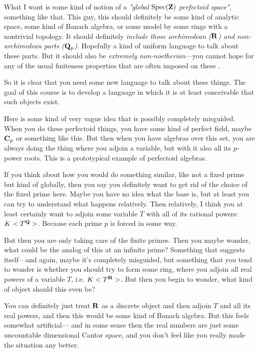 What I want is some kind of notion of a \emph{"global $\operatorname{Spec}(\mathbf Z)$ perfectoid space"}, something like that. This guy, this should definitely be some kind of analytic space, some kind of Banach algebra, or some model by some rings with a nontrivial topology. 
It should definitely \emph{include those archimedean ($\mathbf R$) and non-archimedean parts ($\mathbf Q_p$)}. Hopefully a kind of uniform language to talk about these parts. But it should also be \emph{extremely non-noetherian}---you cannot hope for any of the usual finiteness properties that are often imposed on these .

So it is clear that you need some new language to talk about these things. The goal of this course is to develop a language in which it is at least conceivable that such objects exist.

Here is some kind of very vague idea that is possibly completely misguided. When you do these perfectoid things, you have some kind of perfect field, maybe $\mathbf C_p$ or something like this. But then when you have algebras over this set, you are always doing the thing where you adjoin a variable, but with it also all its $p$-power roots. This is a prototypical example of perfectoid algebras.


If you think about how you would do something similar, like not  a fixed prime but kind of globally, then you say you definitely want to get rid of the choice of the fixed prime here. Maybe you have no idea what the base is, but at least you can try to understand what happens relatively. Then relatively, I think you at least certainly want to adjoin some variable $T$ with all of its rational powers: $K<T^{\mathbf Q}>$. Because each prime $p$ is forced in some way. 

But then you are only taking care of the finite primes. Then you maybe wonder, what could be the analog of this at an infinite prime? Something that suggests itself---and again, maybe it's completely misguided, but something that you tend to wonder is whether you should try to form some ring, where you adjoin all real powers of a variable $T$, i.e. $K<T^{\mathbf R}>$. But then you begin to wonder, what kind of object should this even be?

You can definitely just treat $\mathbf R$ as a discrete object and then adjoin $T$ and all its real powers, and then this would be some kind of Banach algebra. But this feels somewhat artificial--- and in some sense then the real numbers are just some uncountable dimensional Cantor space, and you don't feel like you really made the situation any better.

